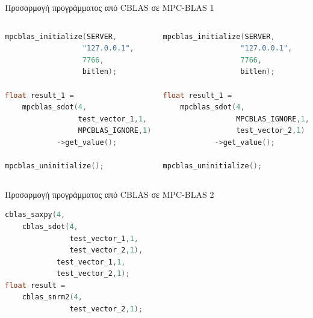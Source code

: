 \documentclass[10pt]{beamer}
\begin{document}
    \begin{frame}[fragile]{Προσαρμογή προγράμματος από CBLAS σε MPC-BLAS 1}
        \begin{columns}[c] %
            \begin{column}{.48\textwidth}
                \begin{block}{}
                    \begin{lstlisting}[firstnumber=1, xleftmargin=5pt, basicstyle=\footnotesize, language=C++]
mpcblas_initialize(SERVER,
                  "127.0.0.1",
                  7766,
                  bitlen);

float result_1 =
    mpcblas_sdot(4,
                 test_vector_1,1,
                 MPCBLAS_IGNORE,1)
            ->get_value();

mpcblas_uninitialize();
                    \end{lstlisting}
                \end{block}
            \end{column}
            \hfill
            \begin{column}{.48\textwidth}
                \begin{block}{}
                    \begin{lstlisting}[firstnumber=1, xleftmargin=5pt, basicstyle=\footnotesize, language=C++]
mpcblas_initialize(SERVER,
                  "127.0.0.1",
                  7766,
                  bitlen);

float result_1 =
    mpcblas_sdot(4,
                 MPCBLAS_IGNORE,1,
                 test_vector_2,1)
            ->get_value();

mpcblas_uninitialize();
                    \end{lstlisting}
                \end{block}
            \end{column}%
        \end{columns}
    \end{frame}

    \begin{frame}[fragile]{Προσαρμογή προγράμματος από CBLAS σε MPC-BLAS 2}
        \begin{block}{}
            \begin{lstlisting}[firstnumber=1, xleftmargin=5pt, basicstyle=\footnotesize, language=C++]
cblas_saxpy(4,
    cblas_sdot(4,
               test_vector_1,1,
               test_vector_2,1),
            test_vector_1,1,
            test_vector_2,1);
float result =
    cblas_snrm2(4,
               test_vector_2,1);
            \end{lstlisting}
        \end{block}
    \end{frame}
\end{document}
